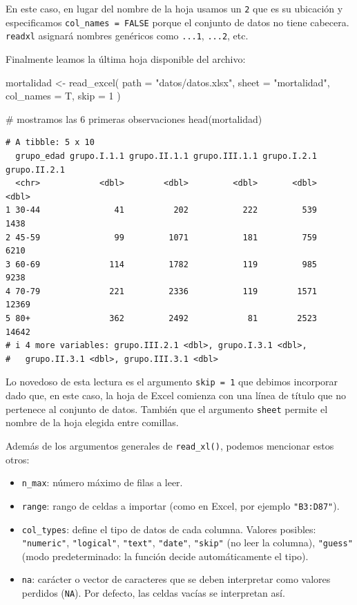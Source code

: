 \documentclass[
  spanish,
  letterpaper,
  DIV=11,
  numbers=noendperiod]{scrreprt}
\newenvironment{Shaded}{\begin{snugshade}}{\end{snugshade}}
\newcommand{\AttributeTok}[1]{\textcolor[rgb]{0.40,0.45,0.13}{#1}}
\newcommand{\CommentTok}[1]{\textcolor[rgb]{0.37,0.37,0.37}{#1}}
\newcommand{\DecValTok}[1]{\textcolor[rgb]{0.68,0.00,0.00}{#1}}
\newcommand{\FunctionTok}[1]{\textcolor[rgb]{0.28,0.35,0.67}{#1}}
\newcommand{\NormalTok}[1]{\textcolor[rgb]{0.00,0.23,0.31}{#1}}
\newcommand{\OtherTok}[1]{\textcolor[rgb]{0.00,0.23,0.31}{#1}}
\newcommand{\StringTok}[1]{\textcolor[rgb]{0.13,0.47,0.30}{#1}}
\begin{document}
En este caso, en lugar del nombre de la hoja usamos un \texttt{2} que es
su ubicación y especificamos \texttt{col\_names\ =\ FALSE} porque el
conjunto de datos no tiene cabecera. \texttt{readxl} asignará nombres
genéricos como \texttt{...1}, \texttt{...2}, etc.

Finalmente leamos la última hoja disponible del archivo:

\begin{Shaded}
\begin{Highlighting}[]
\NormalTok{mortalidad }\OtherTok{\textless{}{-}} \FunctionTok{read\_excel}\NormalTok{(}
  \AttributeTok{path =} \StringTok{"datos/datos.xlsx"}\NormalTok{,}
  \AttributeTok{sheet =} \StringTok{"mortalidad"}\NormalTok{,}
  \AttributeTok{col\_names =}\NormalTok{ T,}
  \AttributeTok{skip =} \DecValTok{1}
\NormalTok{)}

\CommentTok{\# mostramos las 6 primeras observaciones}
\FunctionTok{head}\NormalTok{(mortalidad)}
\end{Highlighting}
\end{Shaded}

\begin{verbatim}
# A tibble: 5 x 10
  grupo_edad grupo.I.1.1 grupo.II.1.1 grupo.III.1.1 grupo.I.2.1 grupo.II.2.1
  <chr>            <dbl>        <dbl>         <dbl>       <dbl>        <dbl>
1 30-44               41          202           222         539         1438
2 45-59               99         1071           181         759         6210
3 60-69              114         1782           119         985         9238
4 70-79              221         2336           119        1571        12369
5 80+                362         2492            81        2523        14642
# i 4 more variables: grupo.III.2.1 <dbl>, grupo.I.3.1 <dbl>,
#   grupo.II.3.1 <dbl>, grupo.III.3.1 <dbl>
\end{verbatim}

Lo novedoso de esta lectura es el argumento \texttt{skip\ =\ 1} que
debimos incorporar dado que, en este caso, la hoja de Excel comienza con
una línea de título que no pertenece al conjunto de datos. También que
el argumento \texttt{sheet} permite el nombre de la hoja elegida entre
comillas.

Además de los argumentos generales de \texttt{read\_xl()}, podemos
mencionar estos otros:

\begin{itemize}
\item
  \texttt{n\_max}: número máximo de filas a leer.
\item
  \texttt{range}: rango de celdas a importar (como en Excel, por ejemplo
  \texttt{"B3:D87"}).
\item
  \texttt{col\_types}: define el tipo de datos de cada columna. Valores
  posibles: \texttt{"numeric"}, \texttt{"logical"}, \texttt{"text"},
  \texttt{"date"}, \texttt{"skip"} (no leer la columna),
  \texttt{"guess"} (modo predeterminado: la función decide
  automáticamente el tipo).
\item
  \texttt{na}: carácter o vector de caracteres que se deben interpretar
  como valores perdidos (\texttt{NA}). Por defecto, las celdas vacías se
  interpretan así.
\end{itemize}
\end{document}
